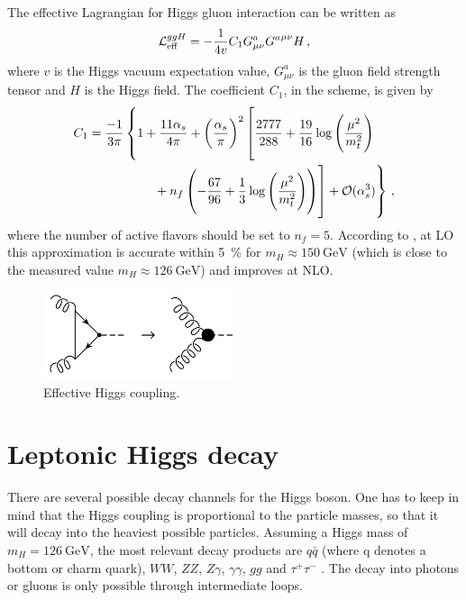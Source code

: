 The effective Lagrangian for Higgs gluon interaction can be written as \cite{gfusionnnlo2}
%
\begin{equation}
	\operatorname{\mathcal{L}}_\text{eff}^{ggH} = - \frac{1}{4v} C_1 G_{\mu \nu}^a {G^a}^{\mu \nu} H \, ,
\end{equation}
%
where $v$ is the Higgs vacuum expectation value, $G^a_{\mu \nu}$ is the gluon field strength tensor and $H$ is the Higgs field.
The coefficient $C_1$, in the \msbar{} scheme, is given by
%
\begin{align}
	C_1 = \frac{-1}{3 \pi} &\left\{1 + \frac{11 \alpha_s}{4 \pi} + \left( \frac{\alpha_s}{\pi} \right)^2 \left[ \frac{2777}{288} + \frac{19}{16} \log\left( \frac{\mu^2}{m_t^2} \right)
	\vphantom{n_f \left( -\frac{67}{96} + \frac{1}{3} \log\left( \frac{\mu^2}{m_t^2} \right) \right)} \right. \right. \nonumber \\
		&\qquad \left. \left. \vphantom{\frac{2777}{288} + \frac{19}{16} \log\left( \frac{\mu^2}{m_t^2} \right)}
		+ n_f \left( -\frac{67}{96} + \frac{1}{3} \log\left( \frac{\mu^2}{m_t^2} \right) \right) \right] + \order{\alpha_s^3} \right\} \, ,
\end{align}
%
where the number of active flavors should be set to $n_f = 5$.
According to \cite{gfusionnnlo2}, at LO this approximation is accurate within \SI{5}{\percent} for $m_H \approx \SI{150}{\giga\electronvolt}$ (which is close to the measured value $m_H \approx \SI{126}{\giga\electronvolt}$) and improves at NLO.
%
\begin{figure}[]
	\includegraphics[width=0.5\textwidth]{images/heft.pdf}
	\caption{Effective Higgs coupling.}
	\label{fig:heft}
\end{figure}
%

\section{Leptonic Higgs decay}
There are several possible decay channels for the Higgs boson.
One has to keep in mind that the Higgs coupling is proportional to the particle masses, so that it will decay into the heaviest possible particles.
Assuming a Higgs mass of $m_H = \SI{126}{\giga\electronvolt}$, the most relevant decay products are $q \bar q$ (where q denotes a bottom or charm quark), $WW$, $ZZ$, $Z \gamma$, $\gamma \gamma$, $gg$ and $\tau^+ \tau^-$ \cite{higgshandbook2}.
The decay into photons or gluons is only possible through intermediate loops.

